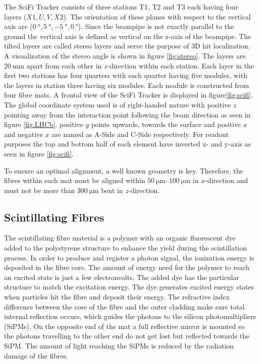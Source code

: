 The SciFi Tracker consists of three stations T1, T2 and T3 each having four layers ($X1, U, V, X2$). The orientation of these planes with respect to the vertical axis are ($\SI{0}{\degree}, \SI{+5}{\degree}, \SI{-5}{\degree}, \SI{0}{\degree}$).
Since the beampipe is not exactly parallel to the ground the vertical axis is
defined as vertical on the z-axis of the beampipe.
The tilted layers are called stereo layers and serve the purpose of 3D hit localization. A visualization of the stereo angle is shown in figure \ref{fig:stereo}.
The layers are $\SI{20}{\milli\metre}$ apart from each other in $z$-direction within each station.
Each layer in the first two stations has four quarters with each quarter having five modules, with the layers in station three having six modules. Each module is constructed from four fibre mats.
A frontal view of the SciFi Tracker is displayed in figure\ref{fig:scifi}.
The global coordinate system used is of right-handed nature with positive $z$ pointing away from the interaction point following the beam direction as seen in figure \ref{fig:LHCb}. positive $y$ points upwards, towards the surface and positive $x$ and negative $x$ are named as A-Side and C-Side respectively\cite{scifiInfo}.
For readout purposes the top and bottom half of each element have inverted x- and y-axis as seen in figure \ref{fig:scifi}.

To ensure an optimal alignment, a well known geometry is key. Therefore, the
fibres within each mat must be aligned within $\SIrange{50}{100}{\micro\metre}$ in $x$-direction and must not be more than $\SI{300}{\micro\metre}$ bent in $z$-direction.

\subsection{Scintillating Fibres}
The scintillating fibre material is a polymer with an organic fluorescent dye
added to the polystyrene structure to enhance the yield during the scintillation process.
In order to produce and register a photon signal, the ionization energy is deposited
in the fibre core. The amount of energy need for the polymer to reach an
excited state is just a few electronvolts\cite{Elevel}. The added dye has the particular structure
to match the excitation energy. The dye generates excited energy states when
particles hit the fibre and deposit their energy.
The refractive index difference between the core of the fibre and the outer cladding make sure total internal reflection occurs, which guides the photons to the silicon photomultipliers (SiPMs).
On the opposite end of the mat a full reflective mirror is mounted so the photons travelling to the other end do not get lost but reflected towards the SiPM.
The amount of light reaching the SiPMs is reduced by the radiation damage of the fibres.
